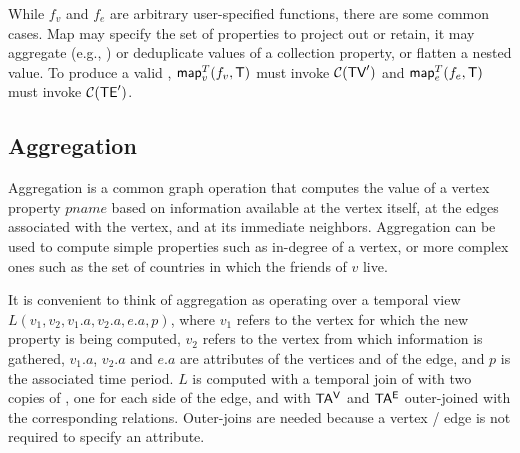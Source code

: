 
While $f_v$ and $f_e$ are arbitrary user-specified functions, there
are some common cases.  Map may specify the set of properties to
project out or retain, it may aggregate (e.g., ) or
deduplicate values of a collection property, or flatten a nested
value.
%
To produce a valid \tg, $\textsf{map}^T_v(f_v, \mathsf{T})$ must invoke $\mathcal{C}(\textsf{TV}')$
and $\textsf{map}^T_e(f_e, \mathsf{T})$ must invoke $\mathcal{C}(\textsf{TE}')$.





\subsection{Aggregation}
\label{sec:algebra:agg}

Aggregation is a common graph operation that computes the value of a
vertex property $pname$ based on information available at the vertex
itself, at the edges associated with the vertex, and at its immediate
neighbors.  Aggregation can be used to compute simple properties such
as in-degree of a vertex, or more complex ones such as the set of
countries in which the friends of $v$ live.

It is convenient to think of aggregation as operating over a temporal
view $L(v_1,v_2,v_1.a,v_2.a,e.a,p)$, where $v_1$ refers to the vertex
for which the new property is being computed, $v_2$ refers to the
vertex from which information is gathered, $v_1.a$, $v_2.a$ and $e.a$
are attributes of the vertices and of the edge, and $p$ is the
associated time period.  $L$ is computed with a temporal join of \te
with two copies of \tv, one for each side of the edge, and with $\mathsf{TA^{V}}$
and $\mathsf{TA^{E}}$ outer-joined with the corresponding relations.  Outer-joins
are needed because a vertex / edge is not required to specify an
attribute.

